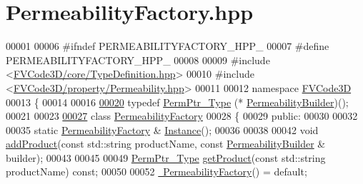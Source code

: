 \hypertarget{PermeabilityFactory_8hpp_source}{}\section{Permeability\+Factory.\+hpp}
\label{PermeabilityFactory_8hpp_source}

\begin{DoxyCode}
00001 
00006 \textcolor{preprocessor}{#ifndef PERMEABILITYFACTORY\_HPP\_}
00007 \textcolor{preprocessor}{#define PERMEABILITYFACTORY\_HPP\_}
00008 
00009 \textcolor{preprocessor}{#include <\hyperlink{TypeDefinition_8hpp}{FVCode3D/core/TypeDefinition.hpp}>}
00010 \textcolor{preprocessor}{#include <\hyperlink{Permeability_8hpp}{FVCode3D/property/Permeability.hpp}>}
00011 
00012 \textcolor{keyword}{namespace }\hyperlink{namespaceFVCode3D}{FVCode3D}
00013 \{
00014 
00016 
\hypertarget{PermeabilityFactory_8hpp_source.tex_l00020}{}\hyperlink{namespaceFVCode3D_ad92e05ac4c0491bab1c45e5457d2518c}{00020} \textcolor{keyword}{typedef} \hyperlink{namespaceFVCode3D_aee5ae48a57366603109f90f526a645b1}{PermPtr\_Type} (* \hyperlink{namespaceFVCode3D_ad92e05ac4c0491bab1c45e5457d2518c}{PermeabilityBuilder})();
00021 
00023 
\hypertarget{PermeabilityFactory_8hpp_source.tex_l00027}{}\hyperlink{classFVCode3D_1_1PermeabilityFactory}{00027} \textcolor{keyword}{class }\hyperlink{classFVCode3D_1_1PermeabilityFactory}{PermeabilityFactory}
00028 \{
00029 \textcolor{keyword}{public}:
00030 
00032 
00035     \textcolor{keyword}{static} \hyperlink{classFVCode3D_1_1PermeabilityFactory}{PermeabilityFactory} & \hyperlink{classFVCode3D_1_1PermeabilityFactory_a4bf654c1bec870030dbfe0a8dfbc721e}{Instance}();
00036 
00038 
00042     \textcolor{keywordtype}{void} \hyperlink{classFVCode3D_1_1PermeabilityFactory_a3a160511216d3258029df8b84a7c322d}{addProduct}(\textcolor{keyword}{const} std::string productName, \textcolor{keyword}{const} 
      \hyperlink{namespaceFVCode3D_ad92e05ac4c0491bab1c45e5457d2518c}{PermeabilityBuilder} & builder);
00043 
00045 
00049     \hyperlink{namespaceFVCode3D_aee5ae48a57366603109f90f526a645b1}{PermPtr\_Type} \hyperlink{classFVCode3D_1_1PermeabilityFactory_a1cba6a88ecaaf1c152877ab632381010}{getProduct}(\textcolor{keyword}{const} std::string productName) \textcolor{keyword}{const};
00050 
00052     \hyperlink{classFVCode3D_1_1PermeabilityFactory_a6cb7bab1a4ce9d2711e68222b6471ab4}{~PermeabilityFactory}() = \textcolor{keywordflow}{default};

\end{DoxyCode}

